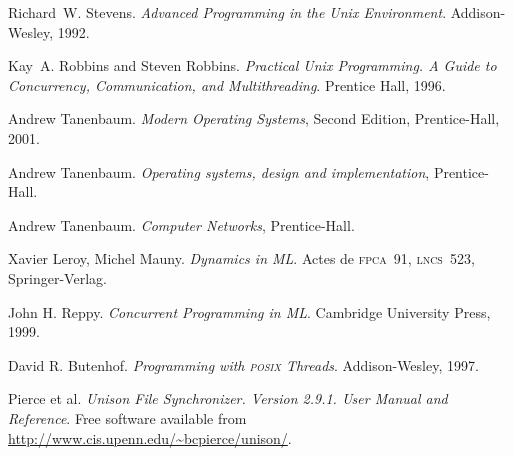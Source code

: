 \begin{thebibliography}{9}
Richard~W. Stevens.
\newblock \emph{Advanced Programming in the Unix Environment}.
\newblock Addison-Wesley, 1992.

Kay~A. Robbins and Steven Robbins.
\newblock \emph{Practical Unix Programming.
A Guide to Concurrency, Communication, and Multithreading}.
\newblock Prentice Hall, 1996.


Andrew Tanenbaum. \emph{Modern Operating Systems},
Second Edition, Prentice-Hall, 2001.


Andrew Tanenbaum. \emph{Operating systems, design and implementation},
Prentice-Hall.

Andrew Tanenbaum. \emph{Computer Networks}, Prentice-Hall.


Xavier Leroy, Michel Mauny. \emph{Dynamics in ML}. Actes de \textsc{fpca}~91,
\textsc{lncs}~523, Springer-Verlag.

John H. Reppy. \emph{Concurrent Programming in ML}.
Cambridge University Press, 1999.


David R. Butenhof.
\emph{{P}rogramming with {\textsc{posix}} {T}hreads}.
Addison-Wesley, 1997.


Pierce et al.
\emph{Unison File Synchronizer. Version 2.9.1.
User Manual and Reference}.
Free software available from
\url{http://www.cis.upenn.edu/~bcpierce/unison/}.
\end{thebibliography}
